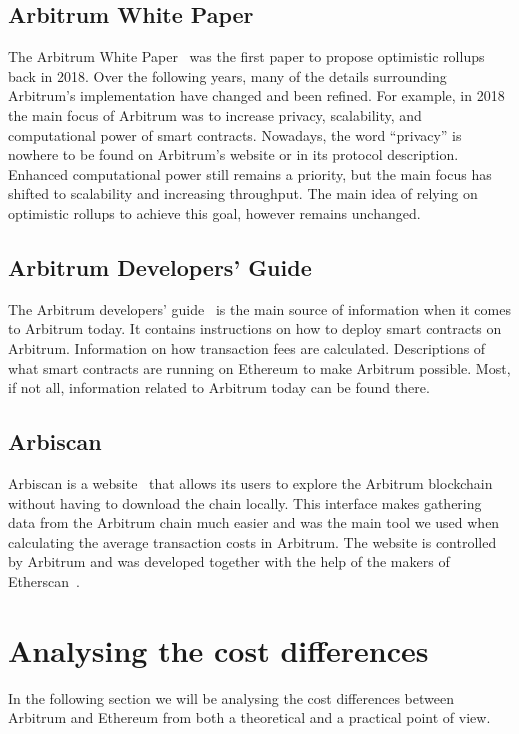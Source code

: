 \documentclass[a4paper,oneside,openright,11pt]{report}
\begin{document}
\section{Arbitrum White Paper}
The Arbitrum White Paper~\cite{ArbWP} was the first paper to propose optimistic rollups back in 2018. 
Over the following years, many of the details surrounding Arbitrum's implementation have changed and been refined. 
For example, in 2018 the main focus of Arbitrum was to increase privacy, scalability, and computational power of smart
contracts. Nowadays, the word ``privacy'' is nowhere to be found on Arbitrum's website or in its protocol description. 
Enhanced computational power still remains a priority, but the main focus has shifted to scalability and 
increasing throughput. The main idea of relying on optimistic rollups to achieve this goal, however
remains unchanged.

\section{Arbitrum Developers' Guide}
The Arbitrum developers' guide~\cite{ArbDevGuide} is the main source of information 
when it comes to Arbitrum today. It contains instructions on how to deploy smart 
contracts on Arbitrum. Information on how transaction fees are calculated. Descriptions 
of what smart contracts are running on Ethereum to make Arbitrum possible. 
Most, if not all, information related to Arbitrum today can be found there.

\section{Arbiscan}
Arbiscan is a website~\cite{Arbiscan} that allows its users to explore the Arbitrum 
blockchain without having to download the chain locally. This interface makes 
gathering data from the Arbitrum chain much easier and was the main tool we used 
when calculating the average transaction costs in Arbitrum.
The website is controlled by Arbitrum and was developed together with the help of 
the makers of Etherscan~\cite{ArbEthScan}.


\chapter{Analysing the cost differences}
In the following section we will be analysing the cost differences between Arbitrum and Ethereum
from both a theoretical and a practical point of view.
\end{document}
